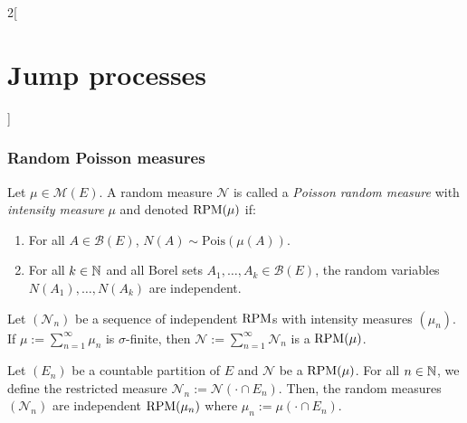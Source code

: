 \documentclass[../../../main_math.tex]{subfiles}
\begin{document}
\begin{multicols}{2}[\section{Jump processes}]
  \subsubsection{Random Poisson measures}
  \begin{definition}
    Let $\mu\in\mathcal{M}(E)$. A random measure $\mathcal{N}$ is called a \emph{Poisson random measure} with \emph{intensity measure} $\mu$ and denoted $\mathrm{RPM}(\mu)$ if:
    \begin{enumerate}
      \item For all $A\in\mathcal{B}(E)$, $N(A)\sim\text{Pois}(\mu(A))$.
      \item For all $k\in\mathbb{N}$ and all Borel sets $A_1,\ldots,A_k\in\mathcal{B}(E)$, the random variables $N(A_1),\ldots,N(A_k)$ are independent.
    \end{enumerate}
  \end{definition}
  \begin{proposition}
    Let ${(\mathcal{N}_n)}$ be a sequence of independent $\mathrm{RPM}$s with intensity measures ${(\mu_n)}$. If $\mu:=\sum_{n=1}^{\infty}\mu_n$ is $\sigma$-finite, then $\mathcal{N}:=\sum_{n=1}^{\infty}\mathcal{N}_n$ is a $\mathrm{RPM}(\mu)$.
  \end{proposition}
  \begin{proposition}
    Let $(E_n)$ be a countable partition of $E$ and $\mathcal{N}$ be a $\mathrm{RPM}(\mu)$. For all $n\in\mathbb{N}$, we define the restricted measure $\mathcal{N}_n:=\mathcal{N}(\cdot\cap E_n)$. Then, the random measures ${(\mathcal{N}_n)}$ are independent $\mathrm{RPM}(\mu_n)$ where $\mu_n:=\mu(\cdot\cap E_n)$.
  \end{proposition}

\end{multicols}
\end{document}
